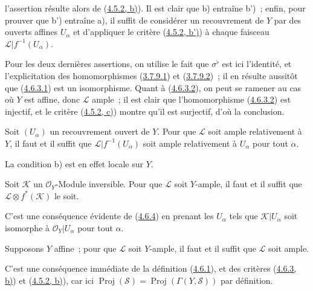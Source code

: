 
l'assertion résulte alors de (\hyperref[II.4.5.2-fr]{4.5.2, b)}). Il est
clair que b) entraîne b')~; enfin, pour prouver que b') entraîne a), il
suffit de considérer un recouvrement de $Y$ par des ouverts affines
$U_\alpha$ et d'appliquer le critère
(\hyperref[II.4.5.2-fr]{4.5.2, b')}) à chaque faisceau
$\mathcal{L}|f^{-1}(U_\alpha)$.

Pour les deux dernières assertions, on utilise le fait que
$\sigma^\flat$ est ici l'identité, et l'explicitation des homomorphismes
(\hyperref[II.3.7.9.1-fr]{3.7.9.1}) et
(\hyperref[II.3.7.9.2-fr]{3.7.9.2})~; il en résulte aussitôt que
(\hyperref[II.4.6.3.1-fr]{4.6.3.1}) est un isomorphisme. Quant à
(\hyperref[II.4.6.3.2-fr]{4.6.3.2}), on peut se ramener au cas où $Y$ est
affine, donc $\mathcal{L}$ ample~; il est clair que l'homomorphisme
(\hyperref[II.4.6.3.2-fr]{4.6.3.2}) est injectif, et le critère
(\hyperref[II.4.5.2-fr]{4.5.2, c)}) montre qu'il est surjectif, d'où la
conclusion.

\begin{corollary}[4.6.4]
\label{II.4.6.4-fr}
Soit $(U_\alpha)$ un recouvrement ouvert de $Y$. Pour que $\mathcal{L}$
soit ample relativement à $Y$, il faut et il suffit que
$\mathcal{L}|f^{-1}(U_\alpha)$ soit ample relativement à $U_\alpha$ pour
tout $\alpha$.
\end{corollary}

La condition b) est en effet locale sur $Y$.

\begin{corollary}[4.6.5]
\label{II.4.6.5-fr}
Soit $\mathcal{K}$ un $\mathcal{O}_Y$-Module inversible. Pour que
$\mathcal{L}$ soit $Y$-ample, il faut et il suffit que
$\mathcal{L}\otimes f^*(\mathcal{K})$ le soit.
\end{corollary}

C'est une conséquence évidente de (\hyperref[II.4.6.4-fr]{4.6.4}) en
prenant les $U_\alpha$ tels que $\mathcal{K}|U_\alpha$ soit isomorphe à
$\mathcal{O}_Y|U_\alpha$ pour tout $\alpha$.

\begin{corollary}[4.6.6]
\label{II.4.6.6-fr}
Supposons $Y$ affine~; pour que $\mathcal{L}$ soit $Y$-ample, il faut et il
suffit que $\mathcal{L}$ soit ample.
\end{corollary}

C'est une conséquence immédiate de la définition
(\hyperref[II.4.6.1-fr]{4.6.1}), et des critères
(\hyperref[II.4.6.3-fr]{4.6.3, b)}) et
(\hyperref[II.4.5.2-fr]{4.5.2, b)}), car ici
$\operatorname{Proj}(\mathcal{S})
=\operatorname{Proj}(\Gamma(Y,\mathcal{S}))$ par définition.

